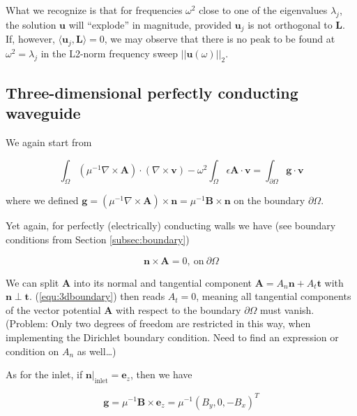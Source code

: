 \documentclass[11pt, a4paper]{article}
\begin{document}
What we recognize is that for frequencies $\omega^2$ close to one of the
eigenvalues $\lambda_j$, the solution $\mathbf{u}$ will \enquote{explode} in magnitude,
provided $\mathbf{u}_j$ is not orthogonal to $\mathbf{L}$. If, however,
$\langle \mathbf{u}_j, \mathbf{L} \rangle = 0$, we may observe that there is no 
peak to be found at $\omega^2 = \lambda_j$ in the L2-norm frequency sweep $||\mathbf{u}(\omega)||_2$.

\subsection{Three-dimensional perfectly conducting waveguide}
\label{subsec:3dwaveguide}

We again start from

\begin{equation}
    \int_{\Omega} (\mu^{-1} \nabla \times \mathbf{A}) \cdot (\nabla \times \mathbf{v})
    - \omega^2 \int_{\Omega}  \epsilon \mathbf{A} \cdot \mathbf{v} 
    = \int_{\partial \Omega} \mathbf{g} \cdot \mathbf{v}
\end{equation}

where we defined $\mathbf{g} = ({\mu^{-1} \nabla \times \mathbf{A}}) \times \mathbf{n} =
\mu^{-1} \mathbf{B} \times \mathbf{n}$ on the boundary $\partial \Omega$.

Yet again, for perfectly (electrically) conducting walls we have (see boundary
conditions from Section \ref{subsec:boundary})

\begin{equation}
    \mathbf{n} \times \mathbf{A} = 0, ~\text{on}~ \partial \Omega \label{equ:3dboundary}
\end{equation}

We can split $\mathbf{A}$ into its normal and tangential component
$\mathbf{A} = A_n \mathbf{n} + A_t \mathbf{t}$ with $\mathbf{n} \perp \mathbf{t}$.
(\ref{equ:3dboundary}) then reads $A_t = 0$, meaning all tangential components of
the vector potential $\mathbf{A}$ with respect to the boundary $\partial \Omega$
must vanish. (Problem: Only two degrees of freedom are restricted in this way,
when implementing the Dirichlet boundary condition. Need to find an expression
or condition on $A_n$ as well\dots)

As for the inlet, if $\mathbf{n}|_{\text{inlet}} = \mathbf{e}_z$, then we have 

\begin{equation}
    \mathbf{g} = \mu^{-1} \mathbf{B} \times \mathbf{e}_z = \mu^{-1}(B_y, 0, -B_x)^T
\end{equation}
\end{document}

